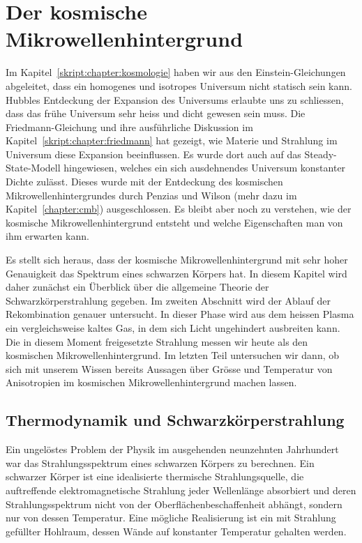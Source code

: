 %
%
%
\chapter{Der kosmische Mikrowellenhintergrund%
\label{skript:chapter:cmb}}
\rhead{}
Im Kapitel~\ref{skript:chapter:kosmologie} haben wir aus den
Einstein-Gleichungen abgeleitet, dass ein homogenes und isotropes
Universum nicht statisch sein kann.
Hubbles Entdeckung der Expansion des Universums erlaubte uns zu
schliessen, dass das frühe Universum sehr heiss und dicht gewesen
sein muss.
Die Friedmann-Gleichung und ihre ausführliche Diskussion im
Kapitel~\ref{skript:chapter:friedmann} hat gezeigt, wie Materie und
Strahlung im Universum diese Expansion beeinflussen.
Es wurde dort auch auf das Steady-State-Modell hingewiesen, welches
ein sich ausdehnendes Universum konstanter Dichte zulässt.
Dieses wurde mit der Entdeckung des kosmischen Mikrowellenhintergrundes durch
Penzias und Wilson (mehr dazu im Kapitel~\ref{chapter:cmb}) ausgeschlossen.
%
%
Es bleibt aber noch zu verstehen, wie der kosmische Mikrowellenhintergrund
entsteht und welche Eigenschaften man von ihm erwarten kann.

Es stellt sich heraus, dass der kosmische Mikrowellenhintergrund mit sehr
hoher Genauigkeit das Spektrum eines schwarzen Körpers hat.
In diesem Kapitel wird daher zunächst ein Überblick über die allgemeine
Theorie der Schwarzkörperstrahlung gegeben.
Im zweiten Abschnitt wird der Ablauf der Rekombination genauer untersucht.
In dieser Phase wird aus dem heissen Plasma ein vergleichsweise kaltes Gas,
in dem sich Licht ungehindert ausbreiten kann.
Die in diesem Moment freigesetzte Strahlung messen wir heute als den
kosmischen Mikrowellenhintergrund.
Im letzten Teil untersuchen wir dann, ob sich mit unserem Wissen
bereits Aussagen über Grösse und Temperatur von Anisotropien im kosmischen
Mikrowellenhintergrund machen lassen.

\section{Thermodynamik und Schwarzkörperstrahlung}
%
Ein ungelöstes Problem der Physik im ausgehenden neunzehnten Jahrhundert
war das Strahlungsspektrum eines schwarzen Körpers zu berechnen.
Ein schwarzer Körper ist eine idealisierte thermische Strahlungsquelle,
die auftreffende elektromagnetische Strahlung jeder Wellenlänge absorbiert
und deren Strahlungsspektrum nicht von der Oberflächenbeschaffenheit
abhängt, sondern nur von dessen Temperatur.
Eine mögliche Realisierung ist ein mit Strahlung gefüllter Hohlraum, dessen
Wände auf konstanter Temperatur gehalten werden.
%

